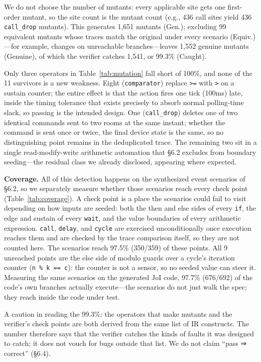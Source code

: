 \documentclass[sigconf,nonacm,anonymous,review]{acmart}
\begin{document}
We do not choose the number of mutants: every applicable site gets one first-order mutant, so the site count is the mutant count (e.g., 436 call sites yield 436 \texttt{call\_drop} mutants). This generates 1,651 mutants (Gen.); excluding 99 equivalent mutants whose traces match the original under every scenario (Equiv.)—for example, changes on unreachable branches—leaves 1,552 genuine mutants (Genuine), of which the verifier catches 1,541, or 99.3\% (Caught).

Only three operators in Table~\ref{tab:mutation} fall short of 100\%, and none of the 11 survivors is a new weakness. Eight (\texttt{comparator}) replace \texttt{>=} with \texttt{>} on a sustain counter; the entire effect is that the action fires one tick (100ms) late, inside the timing tolerance that exists precisely to absorb normal polling-time slack, so passing is the intended design. One (\texttt{call\_drop}) deletes one of two identical commands sent to two rooms at the same instant; whether the command is sent once or twice, the final device state is the same, so no distinguishing point remains in the deduplicated trace. The remaining two sit in a single read-modify-write arithmetic automation that \S6.2 excludes from boundary seeding—the residual class we already disclosed, appearing where expected.

\textbf{Coverage.} All of this detection happens on the synthesized event scenarios of \S6.2, so we separately measure whether those scenarios reach every check point (Table~\ref{tab:coverage}). A check point is a place the scenarios could fail to visit depending on how inputs are seeded: both the then and else sides of every \texttt{if}, the edge and sustain of every \texttt{wait}, and the value boundaries of every arithmetic expression. \texttt{call}, \texttt{delay}, and \texttt{cycle} are exercised unconditionally once execution reaches them and are checked by the trace comparison itself, so they are not counted here. The scenarios reach 97.5\% (350/359) of these points. All 9 unreached points are the else side of modulo guards over a cycle's iteration counter (\texttt{n \% k == c}): the counter is not a sensor, so no seeded value can steer it. Measuring the same scenarios on the generated JoI code, 97.7\% (676/692) of the code's own branches actually execute—the scenarios do not just walk the spec; they reach inside the code under test.

A caution in reading the 99.3\%: the operators that make mutants and the verifier's check points are both derived from the same list of IR constructs. The number therefore says that the verifier catches the kinds of faults it was designed to catch; it does not vouch for bugs outside that list. We do not claim ``pass ⇒ correct'' (\S6.4).
\end{document}

